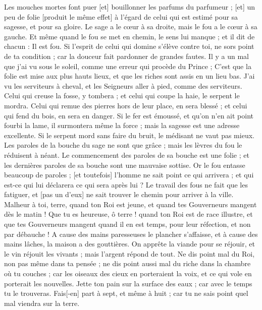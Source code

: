 \begin{multicols}{2}
\VerseOne{}Les mouches mortes font puer [et] bouillonner les parfums du parfumeur ; [et] un peu de folie [produit le même effet] à l'égard de celui qui est estimé pour sa sagesse, et pour sa gloire.
Le sage a le cœur à sa droite, mais le fou a le cœur à sa gauche.
Et même quand le fou se met en chemin, le sens lui manque ; et il dit de chacun : Il est fou.
Si l'esprit de celui qui domine s'élève contre toi, ne sors point de ta condition ; car la douceur fait pardonner de grandes fautes.
Il y a un mal que j'ai vu sous le soleil, comme une erreur qui procède du Prince ;
C'est que la folie est mise aux plus hauts lieux, et que les riches sont assis en un lieu bas.
J'ai vu les serviteurs à cheval, et les Seigneurs aller à pied, comme des serviteurs.
Celui qui creuse la fosse, y tombera ; et celui qui coupe la haie, le serpent le mordra.
Celui qui remue des pierres hors de leur place, en sera blessé ; et celui qui fend du bois, en sera en danger.
Si le fer est émoussé, et qu'on n'en ait point fourbi la lame, il surmontera même la force ; mais la sagesse est une adresse excellente.
Si le serpent mord sans faire du bruit, le médisant ne vaut pas mieux.
Les paroles de la bouche du sage ne sont que grâce ; mais les lèvres du fou le réduisent à néant.
Le commencement des paroles de sa bouche est une folie ; et les dernières paroles de sa bouche sont une mauvaise sottise.
Or le fou entasse beaucoup de paroles ; [et toutefois] l'homme ne sait point ce qui arrivera ; et qui est-ce qui lui déclarera ce qui sera après lui ?
Le travail des fous ne fait que les fatiguer, et [pas un d'eux] ne sait trouver le chemin pour arriver à la ville.
Malheur à toi, terre, quand ton Roi est jeune, et quand tes Gouverneurs mangent dès le matin !
Que tu es heureuse, ô terre ! quand ton Roi est de race illustre, et que tes Gouverneurs mangent quand il en est temps, pour leur réfection, et non par débauche !
A cause des mains paresseuses le plancher s'affaisse, et à cause des mains lâches, la maison a des gouttières.
On apprête la viande pour se réjouir, et le vin réjouit les vivants ; mais l'argent répond de tout.
Ne dis point mal du Roi, non pas même dans ta pensée ; ne dis point aussi mal du riche dans la chambre où tu couches ; car les oiseaux des cieux en porteraient la voix, et ce qui vole en porterait les nouvelles.
\VerseOne{}Jette ton pain sur la surface des eaux ; car avec le temps tu le trouveras.
Fais[-en] part à sept, et même à huit ; car tu ne sais point quel mal viendra sur la terre.

\end{multicols}
